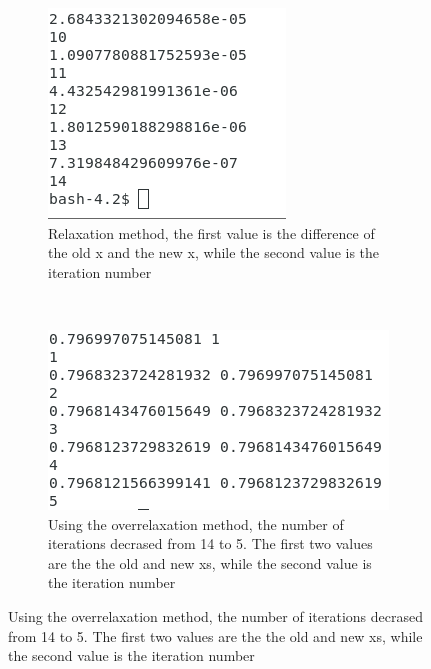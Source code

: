\documentclass[12pt]{article}
\begin{document}
\begin{figure}
    \centering
    \begin{subfigure}[b]{0.4\textwidth}
        \includegraphics[width=\textwidth]{HW2_611_b.png}
        \caption{Relaxation method, the first value is the difference of the old x and the new x, while the second value is the iteration number}
        \label{fig:6.11b}
    \end{subfigure}
    ~ 
    \begin{subfigure}[b]{0.4\textwidth}
        \includegraphics[width=\textwidth]{HW2_611_c.png}
        \caption{Using the overrelaxation method, the number of iterations decrased from 14 to 5. The first two values are the the old and new xs, while the second value is the iteration number}
        \label{fig:6.11c}
    \end{subfigure}
    \end{figure}
\end{document}
